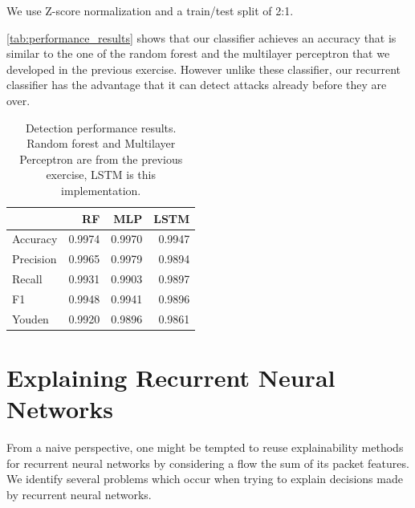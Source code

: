 \documentclass[sigconf,nonacm]{acmart}
\begin{document}
We use Z-score normalization and a train/test split of 2:1.

\autoref{tab:performance_results} shows that our classifier achieves an accuracy that is similar to the one of the random forest and the multilayer perceptron that we developed in the previous exercise. However unlike these classifier, our recurrent classifier has the advantage that it can detect attacks already before they are over. 

\begin{table}
\caption{Detection performance results. Random forest and Multilayer Perceptron are from the previous exercise, LSTM is this implementation.} \label{tab:performance_results}
\begin{tabular}{l r r r} \toprule
& RF & MLP & LSTM \\ \midrule
Accuracy	&	0.9974 & 0.9970	& 0.9947 \\
Precision	&	0.9965 & 0.9979 & 0.9894	\\
Recall	&	0.9931 & 0.9903	& 0.9897 \\
F1	&	0.9948 & 0.9941	& 0.9896 \\
Youden	&	0.9920 & 0.9896 & 0.9861 \\
\bottomrule
\end{tabular}
\end{table}

\section{Explaining Recurrent Neural Networks}
From a naive perspective, one might be tempted to reuse explainability methods for recurrent neural networks by considering a flow the sum of its packet features. 
We identify several problems which occur when trying to explain decisions made by recurrent neural networks.
\end{document}
